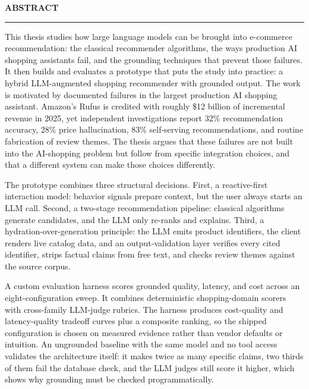 \documentclass[12pt]{report}
\begin{document}
\newpage
{}

\textbf{\Large ABSTRACT}
\vspace{0.5cm}
\hrule
\vspace{0.5cm}

This thesis studies how large language models can be brought into e-commerce recommendation: the classical recommender algorithms, the ways production AI shopping assistants fail, and the grounding techniques that prevent those failures. It then builds and evaluates a prototype that puts the study into practice: a hybrid LLM-augmented shopping recommender with grounded output. The work is motivated by documented failures in the largest production AI shopping assistant. Amazon's Rufus is credited with roughly \$12 billion of incremental revenue in 2025, yet independent investigations report 32\% recommendation accuracy, 28\% price hallucination, 83\% self-serving recommendations, and routine fabrication of review themes. The thesis argues that these failures are not built into the AI-shopping problem but follow from specific integration choices, and that a different system can make those choices differently.

The prototype combines three structural decisions. First, a reactive-first interaction model: behavior signals prepare context, but the user always starts an LLM call. Second, a two-stage recommendation pipeline: classical algorithms generate candidates, and the LLM only re-ranks and explains. Third, a hydration-over-generation principle: the LLM emits product identifiers, the client renders live catalog data, and an output-validation layer verifies every cited identifier, strips factual claims from free text, and checks review themes against the source corpus.

A custom evaluation harness scores grounded quality, latency, and cost across an eight-configuration sweep. It combines deterministic shopping-domain scorers with cross-family LLM-judge rubrics. The harness produces cost-quality and latency-quality tradeoff curves plus a composite ranking, so the shipped configuration is chosen on measured evidence rather than vendor defaults or intuition. An ungrounded baseline with the same model and no tool access validates the architecture itself: it makes twice as many specific claims, two thirds of them fail the database check, and the LLM judges still score it higher, which shows why grounding must be checked programmatically.

\tableofcontents

\newpage
{}








\end{document}
